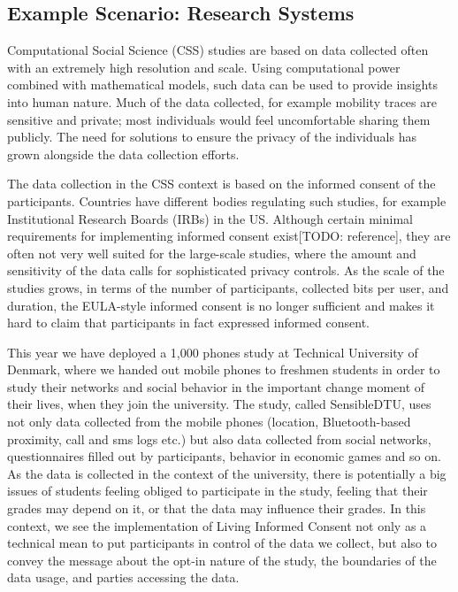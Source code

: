 \subsection{Example Scenario: Research Systems}

Computational Social Science (CSS) studies are based on data collected often with an extremely high resolution and scale. Using computational power combined with mathematical models, such data can be used to provide insights into human nature. Much of the data collected, for example mobility traces are sensitive and private; most individuals would feel uncomfortable sharing them publicly. The need for solutions to ensure the privacy of the individuals has grown alongside the data collection efforts.

The data collection in the CSS context is based on the informed consent of the participants. Countries have different bodies regulating such studies, for example Institutional Research Boards (IRBs) in the US. Although certain minimal requirements for implementing informed consent exist[TODO: reference], they are often not very well suited for the large-scale studies, where the amount and sensitivity of the data calls for sophisticated privacy controls. As the scale of the studies grows, in terms of the number of participants, collected bits per user, and duration, the EULA-style informed consent is no longer sufficient and makes it hard to claim that participants in fact expressed informed consent.

This year we have deployed a 1,000 phones study at Technical University of Denmark, where we handed out mobile phones to freshmen students in order to study their networks and social behavior in the important change moment of their lives, when they join the university. The study, called SensibleDTU, uses not only data collected from the mobile phones (location, Bluetooth-based proximity, call and sms logs etc.) but also data collected from social networks, questionnaires filled out by participants, behavior in economic games and so on. As the data is collected in the context of the university, there is potentially a big issues of students feeling obliged to participate in the study, feeling that their grades may depend on it, or that the data may influence their grades. In this context, we see the implementation of Living Informed Consent not only as a technical mean to put participants in control of the data we collect, but also to convey the message about the opt-in nature of the study, the boundaries of the data usage, and parties accessing the data.


